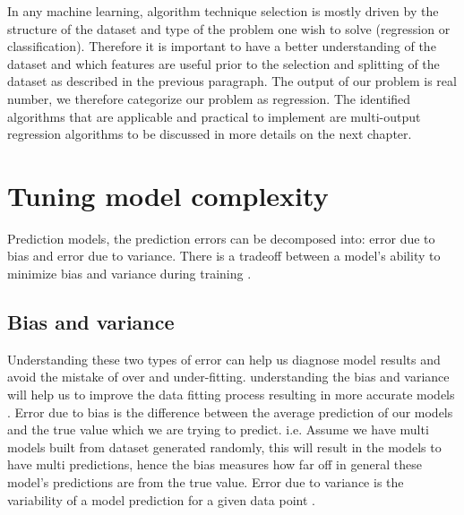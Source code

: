 In any machine learning, algorithm technique selection is mostly driven by the structure of the dataset and type of the problem one wish to solve (regression or classification). Therefore it is important to have a better understanding of the dataset and which features are useful prior to the selection and splitting of the dataset as described in the previous paragraph. The output of our problem is real number, we therefore categorize our problem as regression. The identified algorithms that are applicable and practical to implement are multi-output regression algorithms to be discussed in more details on the next chapter. 


\section{Tuning model complexity}
\label{comp}
Prediction models, the prediction errors can be decomposed into: error due to bias and error due to variance. There is a tradeoff between a model's ability to minimize bias and variance during training \citep{fortmann2012understanding}. 
\subsection{Bias and variance }
Understanding these two types of error can help us diagnose model results and avoid the mistake of over and under-fitting. understanding the bias and variance will help us to improve the data fitting process resulting in more accurate models \citep{fortmann2012understanding}.
Error due to bias is the difference between the average prediction of our models and the true value which we are trying to predict. i.e. Assume we have multi models built from dataset generated randomly, this will result in the models to have multi predictions, hence the bias measures how far off in general these model's predictions are from the true value. Error due to variance is the variability of a model prediction for a given data point \citep{fortmann2012understanding}. 


